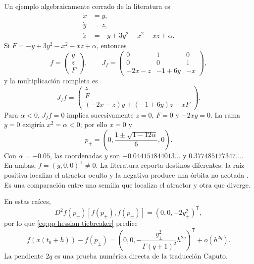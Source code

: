 Un ejemplo algebraicamente cerrado de la literatura es
\begin{align}
 \dot x&=y,\\
 \dot y&=z,\\
 \dot z&=-y+3y^2-x^2-xz+\alpha.
 \label{eq:pp-prasad-system}
\end{align}
Si \(F=-y+3y^2-x^2-xz+\alpha\), entonces
\begin{equation}
 f=\begin{pmatrix}y\\z\\F\end{pmatrix},\qquad
 J_f=\begin{pmatrix}
 0&1&0\\0&0&1\\-2x-z&-1+6y&-x
 \end{pmatrix},
\end{equation}
y la multiplicación completa es
\begin{equation}
 J_f f=\begin{pmatrix}
 z\\F\\(-2x-z)y+(-1+6y)z-xF
 \end{pmatrix}.
 \label{eq:pp-prasad-acceleration}
\end{equation}
Para \(\alpha<0\), \(J_f f=0\) implica sucesivamente
\(z=0\), \(F=0\) y \(-2xy=0\). La rama \(y=0\) exigiría
\(x^2=\alpha<0\); por ello \(x=0\) y
\begin{equation}
 p_\pm=
 \left(0,\frac{1\pm\sqrt{1-12\alpha}}6,0\right).
 \label{eq:pp-prasad-roots}
\end{equation}
Con \(\alpha=-0.05\), las coordenadas \(y\) son
\(-0.044151844013\ldots\) y \(0.377485177347\ldots\). En ambas,
\(f=(y,0,0)^\mathsf T\neq0\). La literatura reporta destinos diferentes:
la raíz positiva localiza el atractor oculto y la negativa produce una órbita
no acotada \cite{Prasad2015Perpetual,DudkowskiPrasadKapitaniak2018}. Es una
comparación entre una semilla que localiza el atractor y otra que diverge.

En estas raíces,
\begin{equation}
 D^2f(p_\pm)[f(p_\pm),f(p_\pm)]
 =(0,0,-2y_\pm^2)^\mathsf T,
\end{equation}
por lo que \cref{eq:pp-hessian-tiebreaker} predice
\begin{equation}
 f(x(t_0+h))-f(p_\pm)
 =\left(0,0,-\frac{y_\pm^2}{\Gamma(q+1)^2}h^{2q}\right)^\mathsf T
 +o(h^{2q}).
 \label{eq:pp-prasad-caputo-prediction}
\end{equation}
La pendiente \(2q\) es una prueba numérica directa de la traducción Caputo.

